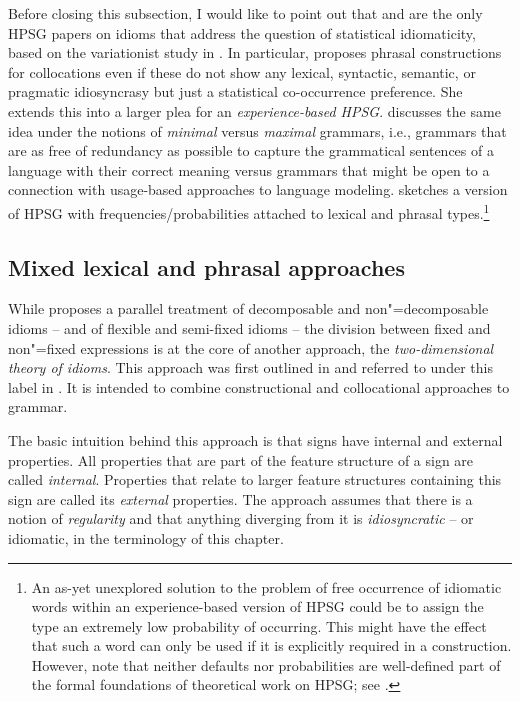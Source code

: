 \documentclass[output=paper
 	        ,biblatex
                ,babelshorthands
                ,newtxmath
                ,draftmode
                ,colorlinks, citecolor=brown
]{langscibook}
\begin{document}
Before closing this subsection, I would like to point out that \citet{Riehemann2001a} and
\citet{RB99a} are the only HPSG papers on idioms that address the question of statistical
idiomaticity, based on the variationist study in \citet{Bender2000a}.
In particular, \citet[--301]{Riehemann2001a} proposes phrasal constructions for
collocations even if these do not show any lexical, syntactic, semantic, or pragmatic idiosyncrasy
but just a statistical co-occurrence preference.  She extends this into a larger plea for an
\emph{experience-based HPSG}.
%
\citet{Bender2000a} discusses the same idea under the notions of \emph{minimal} versus
\emph{maximal} grammars, i.e., grammars that are as free of redundancy as possible to capture the
grammatical sentences of a language with their correct meaning versus grammars that might be open to
a connection with usage-based approaches to language modeling.  \citet[]{Bender2000a} sketches a version of HPSG with frequencies/probabilities attached to lexical and
phrasal types.\footnote{An as-yet unexplored solution to the problem of free occurrence of idiomatic
  words within an experience-based version of HPSG could be to assign the type 
  an extremely low probability of occurring. This might have the effect that such a word can only be
  used if it is explicitly required in a construction. However, note that neither
  defaults nor probabilities are well-defined part of the formal foundations of
  theoretical work on HPSG; see .}

\subsection{Mixed lexical and phrasal approaches}
\label{Sec-Mixed}

While \citet{Riehemann2001a} proposes a parallel treatment of decomposable and non"=decomposable
idioms -- and of flexible and semi-fixed idioms -- the division between fixed and non"=fixed
expressions is at the core of another approach, the \emph{two-dimensional theory of
  idioms}. This approach was first outlined in
\citet{Sailer2000a} and referred to under this label in
\citet{Richter:Sailer:09,Richter:Sailer:14}. It is intended to combine constructional and
collocational approaches to grammar.

The basic intuition behind this approach is that signs have internal and external properties.  All
properties that are part of the feature structure of a sign are called \emph{internal}.  Properties
that relate to larger feature structures containing this sign are called its \emph{external}
properties.  The approach assumes that there is a notion of \emph{regularity} and that anything
diverging from it is \emph{idiosyncratic} -- or idiomatic, in the terminology of this chapter.
\end{document}
